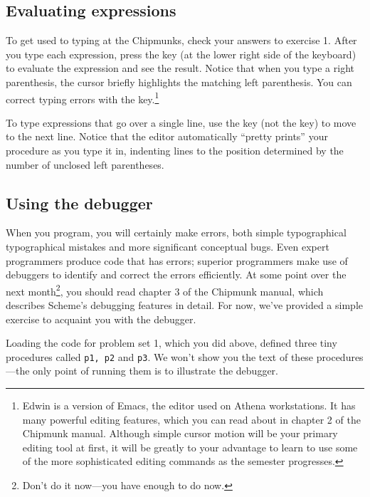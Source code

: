 \subsection{Evaluating expressions} 

To get used to typing at the Chipmunks, check your answers to exercise
1.  After you type each expression, press the  key (at
the lower right side of the keyboard) to evaluate the expression and
see the result.  Notice that when you type a right parenthesis, the
cursor briefly highlights the matching left parenthesis.  You can
correct typing errors with the  key.\footnote{Edwin is
a version of Emacs, the editor used on Athena workstations.  It has
many powerful editing features, which you can read about in chapter 2
of the Chipmunk manual.  Although simple cursor motion will be your
primary editing tool at first, it will be greatly to your advantage to
learn to use some of the more sophisticated editing commands as the
semester progresses.}

To type expressions that go over a single line, use the 
key (not the  key) to move to the next line.  Notice that
the editor automatically ``pretty prints'' your procedure as you type
it in, indenting lines to the position determined by the number of
unclosed left parentheses.

\subsection{Using the debugger}

When you program, you will certainly make errors, both simple typographical
typographical mistakes and more significant conceptual bugs.  Even expert
programmers produce code that has errors; superior programmers make use of
debuggers to identify and correct the errors efficiently.  At some point over
the next month\footnote{Don't do it now---you have enough to do now.}, you
should read chapter 3 of the Chipmunk manual, which describes Scheme's
debugging features in detail.  For now, we've provided a simple exercise to
acquaint you with the debugger.

Loading the code for problem set 1, which you did above, defined three
tiny procedures called {\tt p1, p2} and {\tt p3}.  We won't show you
the text of these procedures---the only point of running them is to
illustrate the debugger.

